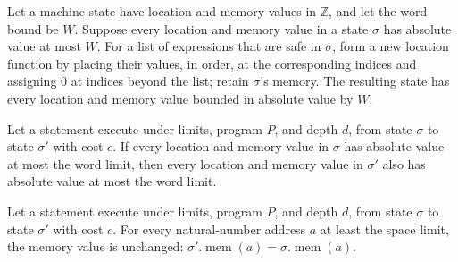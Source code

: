 \begin{theorem}
\label{Light.bounded_callFrame}
\leanok
{}
Let a machine state have location and memory values in $\mathbb Z$, and let the word
bound be $W$. Suppose every location and memory value in a state $\sigma$ has absolute
value at most $W$. For a list of expressions that are safe in $\sigma$, form a new
location function by placing their values, in order, at the corresponding indices and
assigning $0$ at indices beyond the list; retain $\sigma$'s memory. The resulting state
has every location and memory value bounded in absolute value by $W$.
\end{theorem}

\begin{theorem}
\label{Light.Exec.bounded}
\leanok
{}
Let a statement execute under limits, program $P$, and depth $d$, from state $\sigma$ to
state $\sigma'$ with cost $c$. If every location and memory value in $\sigma$ has
absolute value at most the word limit, then every location and memory value in $\sigma'$
also has absolute value at most the word limit.
\end{theorem}

\begin{theorem}
\label{Light.Exec.mem_outside}
\leanok
{}
Let a statement execute under limits, program $P$, and depth $d$, from state $\sigma$ to
state $\sigma'$ with cost $c$. For every natural-number address $a$ at least the space
limit, the memory value is unchanged:
$\sigma'.\operatorname{mem}(a)=\sigma.\operatorname{mem}(a)$.
\end{theorem}
